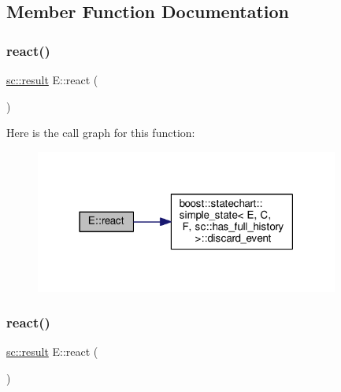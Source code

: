 \subsection{Member Function Documentation}
\mbox{\label{struct_e_af9708ace52c4c8a25da2ae876755854a}} 
\subsubsection{\texorpdfstring{react()}{react()}\hspace{0.1cm}{\footnotesize\ttfamily [1/4]}}
{\footnotesize\ttfamily \mbox{\hyperlink{namespaceboost_1_1statechart_abe807f6598b614d6d87bb951ecd92331}{sc\+::result}} E\+::react (\begin{DoxyParamCaption}\item[{const \mbox{\hyperlink{struct_ev_check}{Ev\+Check}} \&}]{ }\end{DoxyParamCaption})}

Here is the call graph for this function\+:
\nopagebreak
\begin{figure}[H]
\begin{center}
\leavevmode
\includegraphics[width=283pt]{struct_e_af9708ace52c4c8a25da2ae876755854a_cgraph}
\end{center}
\end{figure}
\mbox{\label{struct_e_ad7041b738a0be26a38c6467bafb53887}} 
\subsubsection{\texorpdfstring{react()}{react()}\hspace{0.1cm}{\footnotesize\ttfamily [2/4]}}
{\footnotesize\ttfamily \mbox{\hyperlink{namespaceboost_1_1statechart_abe807f6598b614d6d87bb951ecd92331}{sc\+::result}} E\+::react (\begin{DoxyParamCaption}\item[{const \mbox{\hyperlink{struct_ev_discard_never}{Ev\+Discard\+Never}} \&}]{ }\end{DoxyParamCaption})\hspace{0.3cm}{\ttfamily [inline]}}

